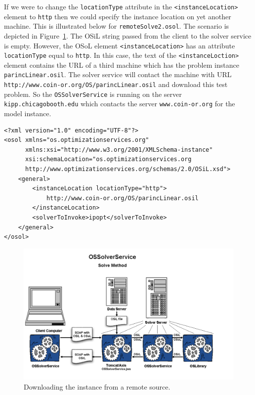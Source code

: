 \documentclass[11pt]{article}
\newcommand{\figurepath}{./figures}
\newcounter{Fig}
\renewcommand{\_}{{\char"5F}}
\renewcommand{\{}{{\char"7B}}
\renewcommand{\}}{{\char"7D}}
\renewcommand{\^}{{\char"0D}}
\renewcommand{\'}{{\char"0D}}
\newcommand{\UrlParinclinear}{http://www.coin-or.org/OS/parincLinear.osil}
\begin{document}
\begin{enumerate}[Step 1:]
If we were to change the {\tt locationType} attribute in the {\tt <instanceLocation>} element to {\tt http} then we
could specify the instance location on yet another machine. This is illustrated below  for {\tt remoteSolve2.osol}.
The scenario is depicted in Figure~\ref{figure:ossolverservice2}.  The OSiL string passed from the client to the solver
service is empty.  However, the OSoL element {\tt <instanceLocation>}  has an attribute {\tt locationType} equal to
{\tt http}.  In this case, the text of the {\tt <instanceLoction>} element contains the URL of a third machine which
has the problem instance {\tt parincLinear.osil}.  The solver service will contact the machine with URL
{\tt\UrlParinclinear} and download this test problem. So the {\tt OSSolverService} is
running on the server {\tt kipp.chicagobooth.edu} which contacts the server {\tt www.coin-or.org} for the model instance.
\begin{verbatim}
<?xml version="1.0" encoding="UTF-8"?>
<osol xmlns="os.optimizationservices.org"
      xmlns:xsi="http://www.w3.org/2001/XMLSchema-instance"
      xsi:schemaLocation="os.optimizationservices.org
      http://www.optimizationservices.org/schemas/2.0/OSiL.xsd">
    <general>
        <instanceLocation locationType="http">
            http://www.coin-or.org/OS/parincLinear.osil
        </instanceLocation>
        <solverToInvoke>ipopt</solverToInvoke>      
    </general>
</osol>
\end{verbatim}

\begin{figure}
\centering
\includegraphics[scale=0.5]{./figures/Figure11.png}
\caption{Downloading the instance from a remote source.}
\label{figure:ossolverservice2}
\end{figure}


\end{enumerate}
\end{document}
